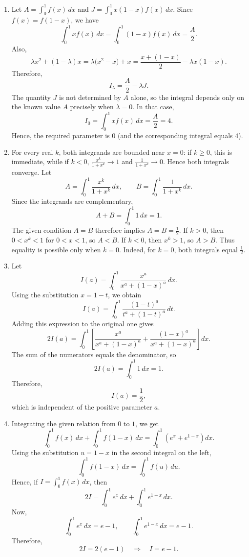 \documentclass[11pt,a4paper]{article}
\begin{document}
\begin{enumerate}
\[\]
Using $u=2-x$ in the reflected integral,
\[
\int_0^2 xg(2-x)\,dx=\int_0^2(2-u)g(u)\,du=2A-M.
\]
Also,
\[
\int_0^2(2x^2-2x)\,dx=2\cdot\frac{8}{3}-2\cdot2=\frac{4}{3}.
\]
Therefore,
\[
M-(2A-M)=\frac{4}{3}\implies 2M-2A=\frac{4}{3}.
\]
Since $A=5$, we obtain
\[
M=5+\frac{2}{3}=\frac{17}{3}.
\]
\item Let $A=\int_0^1 f(x)\,dx$ and $J=\int_0^1 x(1-x)f(x)\,dx$. Since $f(x)=f(1-x)$, we have
\[
\int_0^1 xf(x)\,dx=\int_0^1(1-x)f(x)\,dx=\frac{A}{2}.
\]
Also,
\[
\lambda x^2+(1-\lambda)x=\lambda\bigl(x^2-x\bigr)+x=\frac{x+(1-x)}{2}-\lambda x(1-x).
\]
Therefore,
\[
I_\lambda=\frac{A}{2}-\lambda J.
\]
The quantity $J$ is not determined by $A$ alone, so the integral depends only on the known value $A$ precisely when $\lambda=0$. In that case,
\[
I_0=\int_0^1 xf(x)\,dx=\frac{A}{2}=4.
\]
Hence, the required parameter is $\boxed{0}$ (and the corresponding integral equals $4$).
\item For every real \(k\), both integrands are bounded near \(x=0\): if \(k\ge 0\), this is immediate, while if \(k<0\), \(\frac{x^k}{1+x^k}\to 1\) and \(\frac{1}{1+x^k}\to 0\). Hence both integrals converge. Let
\[
A=\int_0^1\frac{x^k}{1+x^k}\,dx,\qquad B=\int_0^1\frac{1}{1+x^k}\,dx.
\]
Since the integrands are complementary,
\[
A+B=\int_0^1 1\,dx=1.
\]
The given condition \(A=B\) therefore implies \(A=B=\frac12\). If \(k>0\), then \(0<x^k<1\) for \(0<x<1\), so \(A<B\). If \(k<0\), then \(x^k>1\), so \(A>B\). Thus equality is possible only when \(k=0\). Indeed, for \(k=0\), both integrals equal \(\frac12\).
\item Let
\[
I(a)=\int_{0}^{1}\frac{x^{a}}{x^{a}+(1-x)^{a}}\,dx.
\]
Using the substitution $x=1-t$, we obtain
\[
I(a)=\int_{0}^{1}\frac{(1-t)^{a}}{t^{a}+(1-t)^{a}}\,dt.
\]
Adding this expression to the original one gives
\[
2I(a)=\int_{0}^{1}\left[\frac{x^{a}}{x^{a}+(1-x)^{a}}+\frac{(1-x)^{a}}{x^{a}+(1-x)^{a}}\right]dx.
\]
The sum of the numerators equals the denominator, so
\[
2I(a)=\int_{0}^{1}1\,dx=1.
\]
Therefore,
\[
I(a)=\frac{1}{2},
\]
which is independent of the positive parameter $a$.
\item Integrating the given relation from $0$ to $1$, we get
\[
\int_0^1 f(x)\,dx+\int_0^1 f(1-x)\,dx
=\int_0^1\left(e^x+e^{1-x}\right)dx.
\]
Using the substitution $u=1-x$ in the second integral on the left,
\[
\int_0^1 f(1-x)\,dx=\int_0^1 f(u)\,du.
\]
Hence, if $I=\int_0^1 f(x)\,dx$, then
\[
2I=\int_0^1 e^x\,dx+\int_0^1 e^{1-x}\,dx.
\]
Now,
\[
\int_0^1 e^x\,dx=e-1,
\qquad
\int_0^1 e^{1-x}\,dx=e-1.
\]
Therefore,
\[
2I=2(e-1)\quad\Longrightarrow\quad I=e-1.
\]
\end{enumerate}
\end{document}
